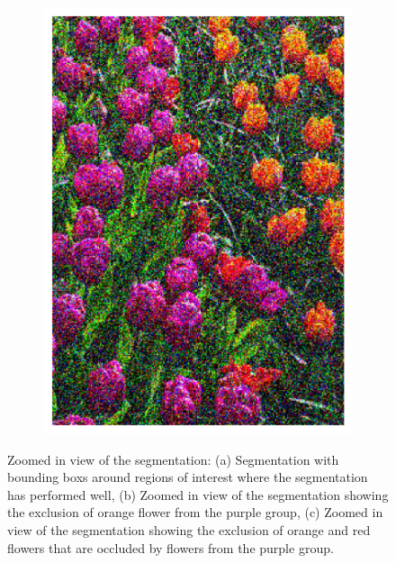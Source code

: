 \documentclass[11pt]{article}
\begin{document}
\begin{figure}[H]
\begin{minipage}[c]{.35\textwidth}
\begin{subfigure}{\textwidth}
            \includegraphics[width=\linewidth]{figs/q1b_zoomed_region2.png}
            \caption{}  %
            \label{fig:q1b_zoomed_bad2}
        \end{subfigure}
    \end{minipage}
    \caption{Zoomed in view of the segmentation: (a) Segmentation with bounding boxs around regions of interest where the segmentation has performed well, (b) Zoomed in view of the segmentation showing the exclusion of orange flower from the purple group, (c) Zoomed in view of the segmentation showing the exclusion of orange and red flowers that are occluded by flowers from the purple group.}
    \label{fig:flowers_seg_zoomed}
\end{figure}
\end{document}
